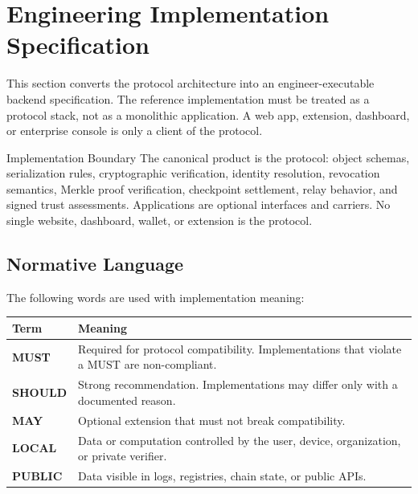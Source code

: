 \documentclass[11pt]{article}
\begin{document}
\section{Engineering Implementation Specification}

This section converts the protocol architecture into an engineer-executable backend specification. The reference implementation must be treated as a protocol stack, not as a monolithic application. A web app, extension, dashboard, or enterprise console is only a client of the protocol.

\begin{principlebox}{Implementation Boundary}
The canonical product is the protocol: object schemas, serialization rules, cryptographic verification, identity resolution, revocation semantics, Merkle proof verification, checkpoint settlement, relay behavior, and signed trust assessments. Applications are optional interfaces and carriers. No single website, dashboard, wallet, or extension is the protocol.
\end{principlebox}

\subsection{Normative Language}

The following words are used with implementation meaning:

\begin{center}
\begin{tabularx}{\textwidth}{>{\bfseries}p{} X}
\toprule
Term & Meaning \\
\midrule
MUST & Required for protocol compatibility. Implementations that violate a MUST are non-compliant. \\
SHOULD & Strong recommendation. Implementations may differ only with a documented reason. \\
MAY & Optional extension that must not break compatibility. \\
LOCAL & Data or computation controlled by the user, device, organization, or private verifier. \\
PUBLIC & Data visible in logs, registries, chain state, or public APIs. \\
\bottomrule
\end{tabularx}
\end{center}
\end{document}
